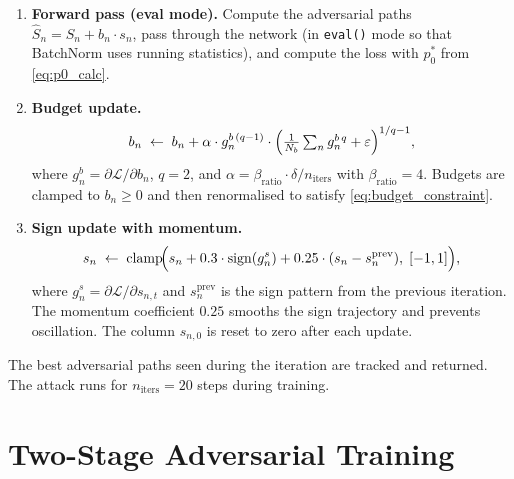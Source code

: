 \begin{enumerate}
  \item \textbf{Forward pass (eval mode).}  Compute the adversarial paths
        $\hat{S}_n = S_n + b_n \cdot s_n$, pass through the network (in
        \texttt{eval()} mode so that BatchNorm uses running statistics), and
        compute the loss with $p_0^*$ from \eqref{eq:p0_calc}.

  \item \textbf{Budget update.}
        \begin{equation}
          b_n \;\leftarrow\; b_n
              + \alpha \cdot g_n^{b\,(q-1)}
                \cdot \Bigl(\tfrac{1}{N_b}\textstyle\sum_n g_n^{b\,q} + \varepsilon\Bigr)^{1/q - 1},
          \label{eq:budget_update}
        \end{equation}
        where $g_n^b = \partial \mathcal{L}/\partial b_n$, $q = 2$, and
        $\alpha = \beta_{\mathrm{ratio}} \cdot \delta / n_{\mathrm{iters}}$
        with $\beta_{\mathrm{ratio}} = 4$.  Budgets are clamped to $b_n \geq 0$
        and then renormalised to satisfy \eqref{eq:budget_constraint}.

  \item \textbf{Sign update with momentum.}
        \begin{equation}
          s_n \;\leftarrow\;
          \mathrm{clamp}\!\Bigl(
            s_n
            + 0.3 \cdot \mathrm{sign}(g_n^s)
            + 0.25 \cdot (s_n - s_n^{\mathrm{prev}})
            ,\; [-1, 1]
          \Bigr),
          \label{eq:sign_update}
        \end{equation}
        where $g_n^s = \partial \mathcal{L}/\partial s_{n,t}$ and
        $s_n^{\mathrm{prev}}$ is the sign pattern from the previous iteration.
        The momentum coefficient $0.25$ smooths the sign trajectory and
        prevents oscillation.  The column $s_{n,0}$ is reset to zero after
        each update.
\end{enumerate}

The best adversarial paths seen during the iteration are tracked and returned.
The attack runs for $n_{\mathrm{iters}} = 20$ steps during training.

\section{Two-Stage Adversarial Training}%
\label{sec:gad_training}

